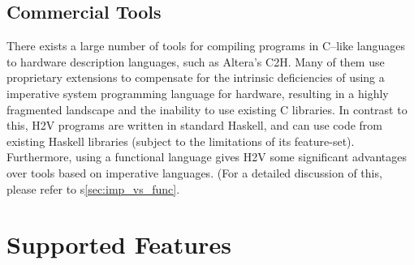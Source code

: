\documentclass[english,onecolumn]{scrartcl}
\begin{document}
\subsection{Commercial Tools}
There exists a large number of tools for compiling programs in C--like languages to hardware description languages,
such as Altera's C2H.\cite{C2H_UG} Many of them use proprietary extensions to compensate for the intrinsic deficiencies of
using a imperative system programming language for hardware, resulting in a highly fragmented landscape and the inability to use
existing C libraries.
In contrast to this, H2V programs are written in standard Haskell, and can use code from existing Haskell libraries (subject to
the limitations of its feature-set). Furthermore, using a functional language gives H2V some significant advantages over tools
based on imperative languages. (For a detailed discussion of this, please refer to s\ref{sec:imp_vs_func}.


\section{Supported Features}
\end{document}
